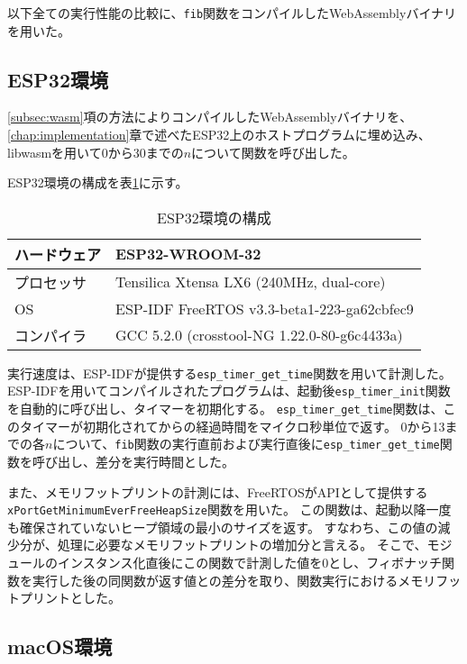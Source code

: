 以下全ての実行性能の比較に、\verb|fib|関数をコンパイルしたWebAssemblyバイナリを用いた。

\subsection{ESP32環境}

\ref{subsec:wasm}項の方法によりコンパイルしたWebAssemblyバイナリを、\ref{chap:implementation}章で述べたESP32上のホストプログラムに埋め込み、libwasmを用いて0から30までの$n$について関数を呼び出した。

ESP32環境の構成を表\ref{tab:esp_spec}に示す。

\begin{table}[htbp]
  \label{tab:esp_spec}
  \caption{ESP32環境の構成}
  \begin{center}
    \begin{tabular}{|l|l|}
    \hline
    ハードウェア & ESP32-WROOM-32 \\ \hline
    プロセッサ & Tensilica Xtensa LX6 (240MHz, dual-core) \\ \hline
    OS & ESP-IDF FreeRTOS v3.3-beta1-223-ga62cbfec9 \\ \hline
    コンパイラ & GCC 5.2.0 (crosstool-NG 1.22.0-80-g6c4433a) \\ \hline
    \end{tabular}
  \end{center}
\end{table}

実行速度は、ESP-IDFが提供する\verb|esp_timer_get_time|関数を用いて計測した。
ESP-IDFを用いてコンパイルされたプログラムは、起動後\verb|esp_timer_init|関数を自動的に呼び出し、タイマーを初期化する。
\verb|esp_timer_get_time|関数は、このタイマーが初期化されてからの経過時間をマイクロ秒単位で返す。
0から13までの各$n$について、\verb|fib|関数の実行直前および実行直後に\verb|esp_timer_get_time|関数を呼び出し、差分を実行時間とした。

また、メモリフットプリントの計測には、FreeRTOSがAPIとして提供する \\
\verb|xPortGetMinimumEverFreeHeapSize|関数を用いた。
この関数は、起動以降一度も確保されていないヒープ領域の最小のサイズを返す。
すなわち、この値の減少分が、処理に必要なメモリフットプリントの増加分と言える。
そこで、モジュールのインスタンス化直後にこの関数で計測した値を0とし、フィボナッチ関数を実行した後の同関数が返す値との差分を取り、関数実行におけるメモリフットプリントとした。

\subsection{macOS環境}

